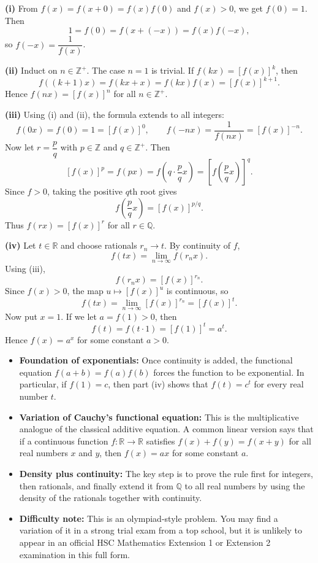 \begin{solution}
\textbf{(i)} From $f(x)=f(x+0)=f(x)f(0)$ and $f(x)>0$, we get $f(0)=1$. Then
\[
1=f(0)=f(x+(-x))=f(x)f(-x),
\]
so $f(-x)=\dfrac{1}{f(x)}$.

\textbf{(ii)} Induct on $n\in\mathbb{Z}^+$. The case $n=1$ is trivial. If $f(kx)=[f(x)]^k$, then
\[
f((k+1)x)=f(kx+x)=f(kx)f(x)=[f(x)]^{k+1}.
\]
Hence $f(nx)=[f(x)]^n$ for all $n\in\mathbb{Z}^+$.

\textbf{(iii)} Using (i) and (ii), the formula extends to all integers:
\[
f(0x)=f(0)=1=[f(x)]^0,\qquad
f(-nx)=\frac{1}{f(nx)}=[f(x)]^{-n}.
\]
Now let $r=\dfrac{p}{q}$ with $p\in\mathbb{Z}$ and $q\in\mathbb{Z}^+$. Then
\[
[f(x)]^p=f(px)=f\!\left(q\cdot \frac{p}{q}x\right)=\left[f\!\left(\frac{p}{q}x\right)\right]^q.
\]
Since $f>0$, taking the positive $q$th root gives
\[
f\!\left(\frac{p}{q}x\right)=[f(x)]^{p/q}.
\]
Thus $f(rx)=[f(x)]^r$ for all $r\in\mathbb{Q}$.

\textbf{(iv)} Let $t\in\mathbb{R}$ and choose rationals $r_n\to t$. By continuity of $f$,
\[
f(tx)=\lim_{n\to\infty} f(r_nx).
\]
Using (iii),
\[
f(r_nx)=[f(x)]^{r_n}.
\]
Since $f(x)>0$, the map $u\mapsto [f(x)]^u$ is continuous, so
\[
f(tx)=\lim_{n\to\infty}[f(x)]^{r_n}=[f(x)]^t.
\]
Now put $x=1$. If we let $a=f(1)>0$, then
\[
f(t)=f(t\cdot 1)=[f(1)]^t=a^t.
\]
Hence $f(x)=a^x$ for some constant $a>0$.
\end{solution}

\begin{takeaways}
    \begin{itemize}[leftmargin=*]
        \item \textbf{Foundation of exponentials:} Once continuity is added, the functional equation $f(a+b)=f(a)f(b)$ forces the function to be exponential. In particular, if $f(1)=c$, then part (iv) shows that $f(t)=c^t$ for every real number $t$.
        \item \textbf{Variation of Cauchy's functional equation:} This is the multiplicative analogue of the classical additive equation. A common linear version says that if a continuous function $f:\mathbb{R}\to\mathbb{R}$ satisfies $f(x)+f(y)=f(x+y)$ for all real numbers $x$ and $y$, then $f(x)=ax$ for some constant $a$.
        \item \textbf{Density plus continuity:} The key step is to prove the rule first for integers, then rationals, and finally extend it from $\mathbb{Q}$ to all real numbers by using the density of the rationals together with continuity.
        \item \textbf{Difficulty note:} This is an olympiad-style problem. You may find a variation of it in a strong trial exam from a top school, but it is unlikely to appear in an official HSC Mathematics Extension 1 or Extension 2 examination in this full form.
    \end{itemize}
\end{takeaways}

